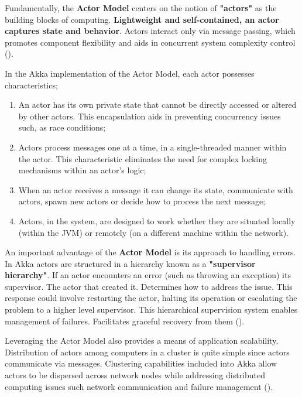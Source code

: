 Fundamentally, the \textbf{Actor Model} centers on the notion of \textbf{"actors"} as the building blocks of computing. \textbf{Lightweight and self-contained, an actor captures state and behavior}. Actors interact only via message passing, which promotes component flexibility and aids in concurrent system complexity control (\cite{kuhnReactiveDesignPatterns2017})\footnotemark[33].

In the Akka implementation of the Actor Model, each actor possesses characteristics;

\begin{enumerate}
    \item An actor has its own private state that cannot be directly accessed or altered by other actors. This encapsulation aids in preventing concurrency issues such, as race conditions;
    \item Actors process messages one at a time, in a single-threaded manner within the actor. This characteristic eliminates the need for complex locking mechanisms within an actor's logic;
    \item When an actor receives a message it can change its state, communicate with actors, spawn new actors or decide how to process the next message;
    \item Actors, in the system, are designed to work whether they are situated locally (within the JVM) or remotely (on a different machine within the network).
\end{enumerate}

An important advantage of the \textbf{Actor Model} is its approach to handling errors. In Akka actors are structured in a hierarchy known as a \textbf{"supervisor hierarchy"}. If an actor encounters an error (such as throwing an exception) its supervisor. The actor that created it. Determines how to address the issue. This response could involve restarting the actor, halting its operation or escalating the problem to a higher level supervisor. This hierarchical supervision system enables management of failures. Facilitates graceful recovery from them (\cite{kuhnReactiveDesignPatterns2017})\footnotemark[33].

Leveraging the Actor Model also provides a means of application scalability. Distribution of actors among computers in a cluster is quite simple since actors communicate via messages. Clustering capabilities included into Akka allow actors to be dispersed across network nodes while addressing distributed computing issues such network communication and failure management (\cite{kuhnReactiveDesignPatterns2017})\footnotemark[33].

